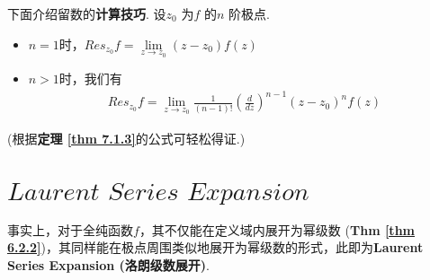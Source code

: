 \vspace{2em}
下面介绍留数的\textbf{计算技巧}. 设$z_0$ 为$f$ 的$n$ 阶极点.
\begin{itemize}
	\item $n = 1$时，$Res_{z_0}f = \underset{z \to z_0}{\lim}{(z - z_0) f(z)}$
	
	\item $n > 1$时，我们有
	\begin{align}
		Res_{z_0}f = \lim_{z \to z_0}{\frac{1}{(n - 1)!} \left( \frac{d}{dz} \right)^{n - 1} (z - z_0)^n f(z)}
	\end{align}
\end{itemize}
\begin{center}
	(根据\textbf{定理 \ref{thm 7.1.3}}的公式可轻松得证.)
\end{center}

\newpage
\section{$Laurent \,\, Series \,\, Expansion$}
事实上，对于全纯函数$f$，其不仅能在定义域内展开为幂级数 (\textbf{Thm \ref{thm 6.2.2}})，其同样能在极点周围类似地展开为幂级数的形式，此即为\textbf{Laurent Series Expansion (洛朗级数展开)}.

